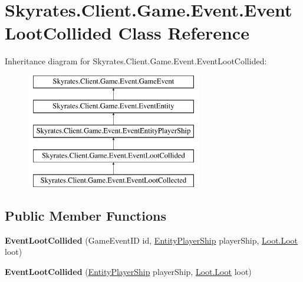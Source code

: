 \hypertarget{class_skyrates_1_1_client_1_1_game_1_1_event_1_1_event_loot_collided}{\section{Skyrates.\-Client.\-Game.\-Event.\-Event\-Loot\-Collided Class Reference}
\label{class_skyrates_1_1_client_1_1_game_1_1_event_1_1_event_loot_collided}
}
Inheritance diagram for Skyrates.\-Client.\-Game.\-Event.\-Event\-Loot\-Collided\-:\begin{figure}[H]
\begin{center}
\leavevmode
\includegraphics[height=5.000000cm]{class_skyrates_1_1_client_1_1_game_1_1_event_1_1_event_loot_collided}
\end{center}
\end{figure}
\subsection*{Public Member Functions}
\begin{DoxyCompactItemize}
\item 
\hypertarget{class_skyrates_1_1_client_1_1_game_1_1_event_1_1_event_loot_collided_ae70f0ee848faf45446a663c046ec1a82}{{\bfseries Event\-Loot\-Collided} (Game\-Event\-I\-D id, \hyperlink{class_skyrates_1_1_client_1_1_entity_1_1_entity_player_ship}{Entity\-Player\-Ship} player\-Ship, \hyperlink{class_skyrates_1_1_client_1_1_loot_1_1_loot}{Loot.\-Loot} loot)}\label{class_skyrates_1_1_client_1_1_game_1_1_event_1_1_event_loot_collided_ae70f0ee848faf45446a663c046ec1a82}

\item 
\hypertarget{class_skyrates_1_1_client_1_1_game_1_1_event_1_1_event_loot_collided_a85362a7ef6660125858f8d6a79a6288e}{{\bfseries Event\-Loot\-Collided} (\hyperlink{class_skyrates_1_1_client_1_1_entity_1_1_entity_player_ship}{Entity\-Player\-Ship} player\-Ship, \hyperlink{class_skyrates_1_1_client_1_1_loot_1_1_loot}{Loot.\-Loot} loot)}\label{class_skyrates_1_1_client_1_1_game_1_1_event_1_1_event_loot_collided_a85362a7ef6660125858f8d6a79a6288e}

\end{DoxyCompactItemize}
